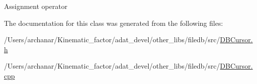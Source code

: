 Assignment operator 

The documentation for this class was generated from the following files\+:\begin{DoxyCompactItemize}
\item 
/\+Users/archanar/\+Kinematic\+\_\+factor/adat\+\_\+devel/other\+\_\+libs/filedb/src/\mbox{\hyperlink{other__libs_2filedb_2src_2DBCursor_8h}{D\+B\+Cursor.\+h}}\item 
/\+Users/archanar/\+Kinematic\+\_\+factor/adat\+\_\+devel/other\+\_\+libs/filedb/src/\mbox{\hyperlink{DBCursor_8cpp}{D\+B\+Cursor.\+cpp}}\end{DoxyCompactItemize}
